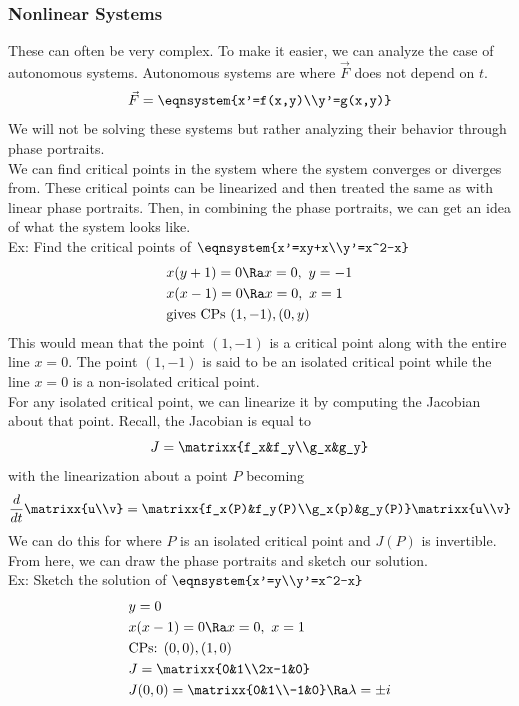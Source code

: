 \subsubsection{Nonlinear Systems}
These can often be very complex. To make it easier, we can analyze the case of autonomous systems. Autonomous systems are where $\vec{F}$ does not depend on $t$.
$$\vec{F}=\eqnsystem{x'=f(x,y)\\y'=g(x,y)}$$
We will not be solving these systems but rather analyzing their behavior through phase portraits.\\
We can find critical points in the system where the system converges or diverges from. These critical points can be linearized and then treated the same as with linear phase portraits. Then, in combining the phase portraits, we can get an idea of what the system looks like.\\
Ex: Find the critical points of $\eqnsystem{x'=xy+x\\y'=x^2-x}$
\begin{align*}
    &x(y+1)=0\Ra x=0,\ y=-1\\
    &x(x-1)=0\Ra x=0,\ x=1\\
    &\text{gives CPs }(1,-1),(0,y)
\end{align*}
This would mean that the point $(1,-1)$ is a critical point along with the entire line $x=0$. The point $(1,-1)$ is said to be an isolated critical point while the line $x=0$ is a non-isolated critical point.\\
For any isolated critical point, we can linearize it by computing the Jacobian about that point. Recall, the Jacobian is equal to
$$J=\matrixx{f_x&f_y\\g_x&g_y}$$
with the linearization about a point $P$ becoming
$$\frac{d}{dt}\matrixx{u\\v}=\matrixx{f_x(P)&f_y(P)\\g_x(p)&g_y(P)}\matrixx{u\\v}$$
We can do this for where $P$ is an isolated critical point and $J(P)$ is invertible.\\
From here, we can draw the phase portraits and sketch our solution.\\
Ex: Sketch the solution of $\eqnsystem{x'=y\\y'=x^2-x}$
\begin{align*}
    &y=0\\
    &x(x-1)=0\Ra x=0,\ x=1\\
    &\text{CPs: }(0,0),(1,0)\\
    &J=\matrixx{0&1\\2x-1&0}\\
    &J(0,0)=\matrixx{0&1\\-1&0}\Ra \lambda=\pm i
\end{align*}
